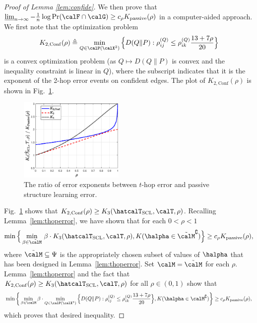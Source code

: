 \documentclass[11pt,onecolumn]{article}
\newcommand{\Passive}{{\rm passive}}
\begin{document}
\begin{proof}[Proof of Lemma \ref{lem:confide}]
	We then prove that $\varliminf_{n\rightarrow\infty} -\frac{1}{n}\log\Pr(\calF\cap \calG)\geq c_{\rho}K _{\Passive}(\rho)$ in a computer-aided approach. We first note that the optimization problem 
	\begin{align}
	K_{2,\mathrm{Conf}}(\rho)\triangleq\min_{Q\in\calP(\calX^{3})}    \Big\{D(Q\|P):\rho^{(Q)}_{ij}\leq\rho^{(Q)}_{ik}\frac{13+7\rho}{20}\Big\}
	\end{align}
	is a convex optimization problem (as $Q\mapsto D(Q\|P)$ is convex and the inequality constraint is linear in $Q$), where the subscript indicates that it is the exponent of the 2-hop error events on confident edges. The plot of $K_{2,\mathrm{Conf}}(\rho)$ is shown in Fig.~\ref{fig:thoperr_1}.
	
	\begin{figure}[t]
		\centering 
		\includegraphics[width=0.45\textwidth]{thoperror_1.eps} 
		\caption{The ratio of error exponents between $t$-hop error and passive structure learning error.} 
		\label{fig:thoperr_1} 
	\end{figure}

	Fig.~\ref{fig:thoperr_1} shows that $K_{2,\mathrm{Conf}}(\rho)\geq K_{3}(\hatcalT_{{\rm SCL}},\calT,\rho)$. Recalling Lemma~\ref{lem:thoperror}, we have shown that for each $0<\rho<1$
	\begin{align}
	    \min\Big\{\min_{\beta\in \tilde{\calM} }\,\beta \cdot K _{3}(\hatcalT_{{\rm SCL}},\calT,\rho),K (\halpha\in \tilde{\calM}^{\complement})\Big\}\geq c_{\rho}K_{\Passive}(\rho),
	\end{align}
	where $\tilde{\calM}\subseteq \Psi$ is the appropriately chosen subset of values of $\halpha$ that has been designed in Lemma~\ref{lem:thoperror}. 
	Set $\calM=\tilde{\calM}$ for each $\rho$. Lemma~\ref{lem:thoperror} and the fact that $K_{2,\mathrm{Conf}}(\rho)\geq K _{3}(\hatcalT_{{\rm SCL}},\calT,\rho)$ for all $\rho\in(0,1)$ show that
	\begin{align}
	    \min\bigg\{\min_{\beta\in \calM} \beta\cdot \min_{Q\in\calP(\calX^{3})} \Big\{D(Q\|P):\rho^{(Q)}_{ij}\leq\rho^{(Q)}_{ik}\frac{13+7\rho}{20}\Big\},K (\halpha\in \calM^{\complement})\bigg\}\geq c_{\rho}K_{\Passive}(\rho),
	\end{align}
	which proves that desired inequality.
\end{proof}
\end{document}
